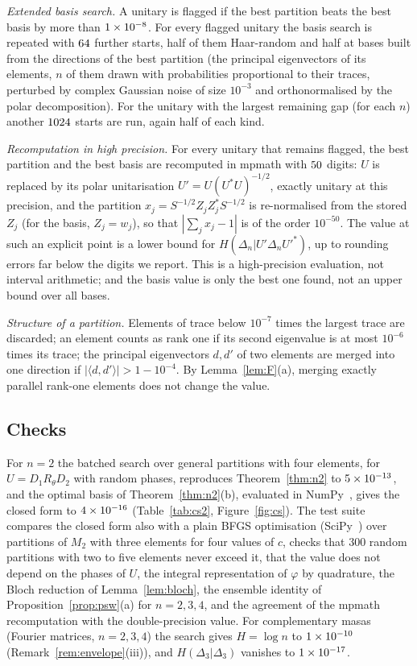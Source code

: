 \documentclass[11pt]{article}
\theoremstyle{plain}
\theoremstyle{definition}
\theoremstyle{remark}
\begin{document}
\emph{Extended basis search.} A unitary is flagged if the best partition beats the best basis by more than $1\times10^{-8}$. For every
flagged unitary the basis search is repeated with $64$ further starts, half of them Haar-random and half at bases
built from the directions of the best partition (the principal eigenvectors of its elements, $n$ of them drawn with
probabilities proportional to their traces, perturbed by complex Gaussian noise of size $10^{-3}$ and orthonormalised by the
polar decomposition). For the unitary with the largest remaining gap (for each $n$) another $1024$ starts are run,
again half of each kind.

\emph{Recomputation in high precision.} For every unitary that remains flagged, the best partition and the best basis are
recomputed in mpmath with $50$ digits: $U$ is replaced by its polar unitarisation $U'=U(U^*U)^{-1/2}$, exactly unitary at
this precision, and the partition $x_j=S^{-1/2}Z_jZ_j^*S^{-1/2}$ is re-normalised from the stored $Z_j$ (for the basis, $Z_j=w_j$),
so that $|\sum_jx_j-1|$ is of the order $10^{-50}$. The value at such an explicit point is a lower bound for
$H(\Delta_n|U'\Delta_nU'^*)$, up to rounding errors far below the digits we report. This is a high-precision evaluation, not
interval arithmetic; and the basis value is only the best one found, not an upper bound over all bases.

\emph{Structure of a partition.} Elements of trace below $10^{-7}$ times the largest trace are discarded; an element counts as rank
one if its second eigenvalue is at most $10^{-6}$ times its trace; the principal eigenvectors $d,d'$ of two elements are merged
into one direction if $|\langle d,d'\rangle|>1-10^{-4}$. By Lemma~\ref{lem:F}(a), merging exactly parallel rank-one elements does
not change the value.

\subsection{Checks}

For $n=2$ the batched search over general partitions with four elements, for $U=D_1R_\theta D_2$ with random phases, reproduces
Theorem~\ref{thm:n2} to $5\times10^{-13}$, and the optimal basis of Theorem~\ref{thm:n2}(b), evaluated in NumPy~\cite{harris2020},
gives the closed form to $4\times10^{-16}$ (Table~\ref{tab:cs2}, Figure~\ref{fig:cs}). The test suite compares the closed form
also with a plain BFGS optimisation (SciPy~\cite{virtanen2020}) over partitions of $M_2$ with three elements for four values
of $c$, checks that $300$ random partitions with two to five elements never exceed it, that the value does not depend on the
phases of $U$, the integral representation of $\varphi$ by quadrature, the Bloch reduction of Lemma~\ref{lem:bloch}, the ensemble
identity of Proposition~\ref{prop:psw}(a) for $n=2,3,4$, and the agreement of the mpmath recomputation with the double-precision
value. For complementary masas (Fourier matrices, $n=2,3,4$) the search gives $H=\log n$ to $1\times10^{-10}$
(Remark~\ref{rem:envelope}(iii)), and $H(\Delta_3|\Delta_3)$ vanishes to $1\times10^{-17}$.
\end{document}
